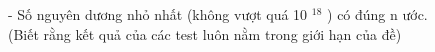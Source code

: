 - Số nguyên dương nhỏ nhất (không vượt quá 10   $^    18   $   ) có đúng n ước.   
\\   (Biết rằng kết quả của các test luôn nằm trong giới hạn của đề)  

\